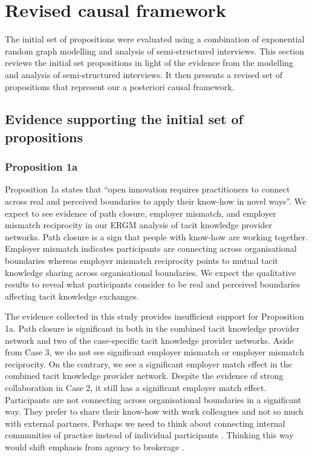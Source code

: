 \section{Revised causal framework}

The initial set of propositions were evaluated using a combination of exponential random graph modelling and analysis of semi-structured interviews. This section reviews the initial set propositions in light of the evidence from the modelling and analysis of semi-structured interviews. It then presents a revised set of propositions that represent our a posteriori causal framework.

\subsection{Evidence supporting the initial set of propositions}

\subsubsection{Proposition 1a}

Proposition 1a states that \enquote{open innovation requires practitioners to connect across real and perceived boundaries to apply their know-how in novel ways}. We expect to see evidence of path closure, employer mismatch, and employer mismatch reciprocity in our ERGM analysis of tacit knowledge provider networks. Path closure is a sign that people with know-how are working together. Employer mismatch indicates participants are connecting across organisational boundaries whereas employer mismatch reciprocity points to mutual tacit knowledge sharing across organisational boundaries. We expect the qualitative results to reveal what participants consider to be real and perceived boundaries affecting tacit knowledge exchanges. \medskip 

The evidence collected in this study provides insufficient support for Proposition 1a. Path closure is significant in both in the combined tacit knowledge provider network and two of the case-specific tacit knowledge provider networks. Aside from Case 3, we do not see significant employer mismatch or employer mismatch reciprocity. On the contrary, we see a significant employer match effect in the combined tacit knowledge provider network. Despite the evidence of strong collaboration in Case 2, it still has a significant employer match effect. Participants are not connecting across organisational boundaries in a significant way. They prefer to share their know-how with work colleagues and not so much with external partners. Perhaps we need to think about connecting internal communities of practice instead of individual participants \cite{garrety2004integrating,venkitachalam2012tacit}. Thinking this way would shift emphasis from agency to brokerage \citep{wenger2000communities}. 

